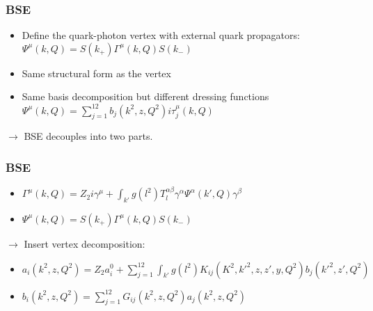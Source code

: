  \begin{frame}\frametitle{BSE}

	
\begin{itemize}
	\item Define the quark-photon vertex with external quark propagators:\\
		$\Psi^{\mu}(k, Q) = S(k_+) \Gamma^{\mu}(k,Q)S(k_-)$
	\item Same structural form as the vertex
	\item Same basis decomposition but different dressing functions \\
	$\Psi^{\mu}(k, Q) = \sum_{j = 1}^{12}b_j(k^2,z,Q^2)i \tau_j^{\mu}(k,Q)$ 
\end{itemize}

$\longrightarrow $ BSE decouples into two parts.

\end{frame}

 \begin{frame}\frametitle{BSE}

	
\begin{itemize}
	\item $\Gamma^{\mu}(k,Q) = Z_2 i \gamma^{\mu} + \int_{k'}g(l^2) T_l^{\alpha \beta} \gamma^{\alpha} \Psi^{\alpha}(k',Q) \gamma^{\beta}$
	\item $\Psi^{\mu}(k, Q) = S(k_+) \Gamma^{\mu}(k,Q)S(k_-)$
\end{itemize}
 $\rightarrow$ Insert vertex decomposition:
\begin{itemize}
	\item $a_i(k^2,z,Q^2) = Z_2 a_i^0 + \sum_{j = 1}^{12} \int_{k'}g(l^2) K_{ij}(K^2,k'^2,z,z',y,Q^2)b_j(k'^2,z',Q^2)$
	\item $b_i(k^2,z,Q^2) = \sum_{j=1}^{12} G_{ij}(k^2,z,Q^2)a_j(k^2,z,Q^2)$ 
\end{itemize}

\end{frame}

\endinput
